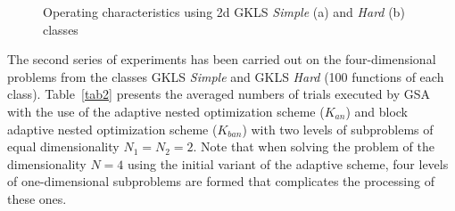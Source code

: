 \documentclass[runningheads]{llncs}
\begin{document}
\begin{figure}
\begin{minipage}{0.5\linewidth}
\end{minipage}
\begin{minipage}{0.5\linewidth}
\end{minipage}
\caption{Operating characteristics using 2d GKLS \textit{Simple} (a) and \textit{Hard} (b) classes}
\label{fig2}
\end{figure}

The second series of experiments has been carried out on the four-dimensional problems from the classes GKLS 
\textit{Simple} and GKLS \textit{Hard} (100 functions of each class). Table~\ref{tab2}  presents the averaged numbers 
of trials executed by GSA with the use of the adaptive nested optimization scheme ($K_{an}$) and block adaptive nested 
optimization scheme ($K_{ban}$) with two levels of subproblems of equal dimensionality $N_1=N_2=2$. 
Note that when solving the problem of the dimensionality $N=4$ using the initial variant of the adaptive scheme, four 
levels of one-dimensional subproblems are formed that complicates the processing of these ones.
\end{document}
